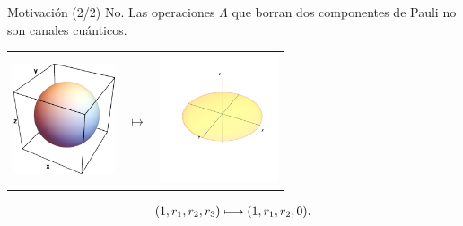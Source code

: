 \documentclass[xcolor=dvipsnames,presentation]{beamer}%
\begin{document}
\begin{frame}{Motivación (2/2)}
	\alert{No.}
	Las operaciones $\Lambda$ que borran dos componentes de Pauli no 
	son canales cuánticos.
	\begin{center}
	\begin{tabular}{m{2.5cm} m{1.3cm} m{2.5cm}}
		\includegraphics[width=3cm]{images/bloch-ball}
		& \hfill \LARGE{$\longmapsto$}
		& \includegraphics[width=3.5cm]{images/diskXY}
	\end{tabular}
	\end{center}
	\begin{align*}
	\qty(1,r_1,r_2,r_3)\longmapsto\qty(1,r_1,r_2,0).
	\end{align*}
	
	
		
	\vspace{.5cm}
\end{frame}
\end{document}
